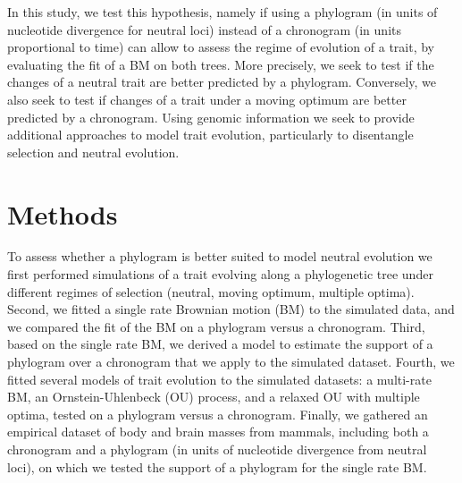 \documentclass{article}
\begin{document}
In this study, we test this hypothesis, namely if using a phylogram (in units of nucleotide divergence for neutral loci) instead of a chronogram (in units proportional to time) can allow to assess the regime of evolution of a trait, by evaluating the fit of a BM on both trees.
More precisely, we seek to test if the changes of a neutral trait are better predicted by a phylogram.
Conversely, we also seek to test if changes of a trait under a moving optimum are better predicted by a chronogram.
Using genomic information we seek to provide additional approaches to model trait evolution, particularly to disentangle selection and neutral evolution.

\section*{Methods}
To assess whether a phylogram is better suited to model neutral evolution we first performed simulations of a trait evolving along a phylogenetic tree under different regimes of selection (neutral, moving optimum, multiple optima).
Second, we fitted a single rate Brownian motion (BM) to the simulated data, and we compared the fit of the BM on a phylogram versus a chronogram.
Third, based on the single rate BM, we derived a model to estimate the support of a phylogram over a chronogram that we apply to the simulated dataset.
Fourth, we fitted several models of trait evolution to the simulated datasets: a multi-rate BM, an Ornstein-Uhlenbeck (OU) process, and a relaxed OU with multiple optima, tested on a phylogram versus a chronogram.
Finally, we gathered an empirical dataset of body and brain masses from mammals, including both a chronogram and a phylogram (in units of nucleotide divergence from neutral loci), on which we tested the support of a phylogram for the single rate BM.
\end{document}
